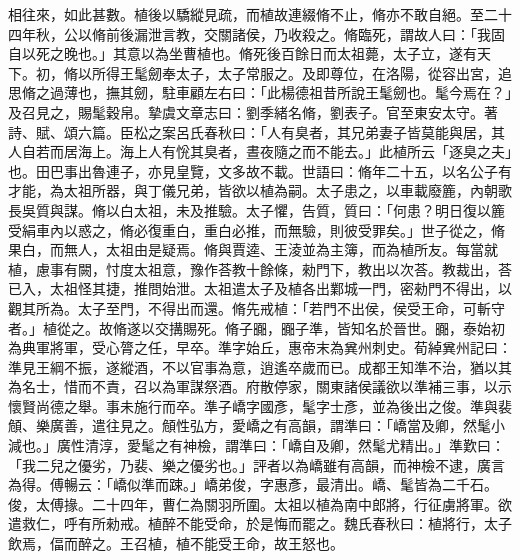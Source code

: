 \begin{pinyinscope}
相往來，如此甚數。植後以驕縱見疏，而植故連綴脩不止，脩亦不敢自絕。至二十四年秋，公以脩前後漏泄言教，交關諸侯，乃收殺之。脩臨死，謂故人曰：「我固自以死之晚也。」其意以為坐曹植也。脩死後百餘日而太祖薨，太子立，遂有天下。初，脩以所得王髦劒奉太子，太子常服之。及即尊位，在洛陽，從容出宮，追思脩之過薄也，撫其劒，駐車顧左右曰：「此楊德祖昔所說王髦劒也。髦今焉在？」及召見之，賜髦穀帛。摯虞文章志曰：劉季緒名脩，劉表子。官至東安太守。著詩、賦、頌六篇。臣松之案呂氏春秋曰：「人有臭者，其兄弟妻子皆莫能與居，其人自若而居海上。海上人有恱其臭者，晝夜隨之而不能去。」此植所云「逐臭之夫」也。田巴事出魯連子，亦見皇覽，文多故不載。世語曰：脩年二十五，以名公子有才能，為太祖所器，與丁儀兄弟，皆欲以植為嗣。太子患之，以車載廢簏，內朝歌長吳質與謀。脩以白太祖，未及推驗。太子懼，告質，質曰：「何患？明日復以簏受絹車內以惑之，脩必復重白，重白必推，而無驗，則彼受罪矣。」世子從之，脩果白，而無人，太祖由是疑焉。脩與賈逵、王淩並為主簿，而為植所友。每當就植，慮事有闕，忖度太祖意，豫作荅教十餘條，勑門下，教出以次荅。教裁出，荅已入，太祖怪其捷，推問始泄。太祖遣太子及植各出鄴城一門，密勑門不得出，以觀其所為。太子至門，不得出而還。脩先戒植：「若門不出侯，侯受王命，可斬守者。」植從之。故脩遂以交搆賜死。脩子嚻，嚻子準，皆知名於晉世。嚻，泰始初為典軍將軍，受心膂之任，早卒。準字始丘，惠帝末為兾州刺史。荀綽兾州記曰：準見王綱不振，遂縱酒，不以官事為意，逍遙卒歲而已。成都王知準不治，猶以其為名士，惜而不責，召以為軍謀祭酒。府散停家，關東諸侯議欲以準補三事，以示懷賢尚德之舉。事未施行而卒。準子嶠字國彥，髦字士彥，並為後出之俊。準與裴頠、樂廣善，遣往見之。頠性弘方，愛嶠之有高韻，謂準曰：「嶠當及卿，然髦小減也。」廣性清淳，愛髦之有神檢，謂準曰：「嶠自及卿，然髦尤精出。」準歎曰：「我二兒之優劣，乃裴、樂之優劣也。」評者以為嶠雖有高韻，而神檢不逮，廣言為得。傅暢云：「嶠似準而踈。」嶠弟俊，字惠彥，最清出。嶠、髦皆為二千石。俊，太傅掾。二十四年，曹仁為關羽所圍。太祖以植為南中郎將，行征虜將軍。欲遣救仁，呼有所勑戒。植醉不能受命，於是悔而罷之。魏氏春秋曰：植將行，太子飲焉，偪而醉之。王召植，植不能受王命，故王怒也。


\end{pinyinscope}
